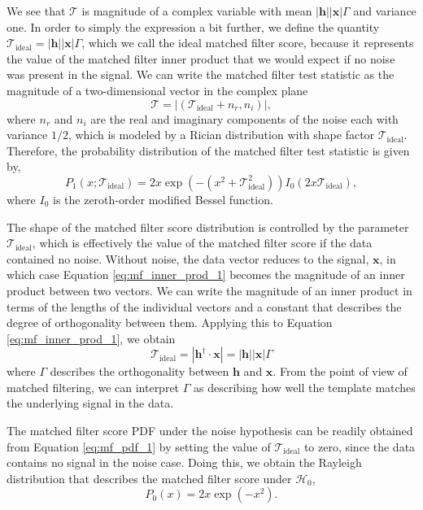 We see that $\mathcal{T}$ is magnitude of a complex variable with mean $|\mathbf{h}||\mathbf{x}|\Gamma$ and variance one. In order to simply the expression a bit further, we define the quantity $\mathcal{T}_\mathrm{ideal}=|\mathbf{h}||\mathbf{x}|\Gamma$, which we call the ideal matched filter score, because it represents the value of the matched filter inner product that we would expect if no noise was present in the signal. We can write the matched filter test statistic as the magnitude of a two-dimensional vector in the complex plane
\begin{equation}
    \mathcal{T}=|\left(\mathcal{T}_\mathrm{ideal}+n_r, n_i\right)|,
\end{equation}
where $n_r$ and $n_i$ are the real and imaginary components of the noise each with variance $1/2$, which is modeled by a Rician distribution with shape factor $\mathcal{T}_\mathrm{ideal}$. Therefore, the probability distribution of the matched filter test statistic is given by,
\begin{equation}
    P_1(x;\mathcal{T}_\mathrm{ideal})=2x\exp{\left(-\left(x^2+\mathcal{T}_\mathrm{ideal}^2\right)\right)}I_0\left(2x\mathcal{T}_\mathrm{ideal}\right),
    \label{eq:mf_pdf_1}
\end{equation}
where $I_0$ is the zeroth-order modified Bessel function.

The shape of the matched filter score distribution is controlled by the parameter $\mathcal{T}_\mathrm{ideal}$, which is effectively the value of the matched filter score if the data contained no noise. Without noise, the data vector reduces to the signal, $\mathbf{x}$, in which case Equation \ref{eq:mf_inner_prod_1} becomes the magnitude of an inner product between two vectors. We can write the magnitude of an inner product in terms of the lengths of the individual vectors and a constant that describes the degree of orthogonality between them. Applying this to Equation \ref{eq:mf_inner_prod_1}, we obtain
\begin{equation}
    \mathcal{T}_\mathrm{ideal}=\left|\mathbf{h}^\dagger\cdot\mathbf{x}\right| = \left|\mathbf{h}\right|\left|\mathbf{x}\right|\Gamma
\end{equation}
where $\Gamma$ describes the orthogonality between $\mathbf{h}$ and $\mathbf{x}$. From the point of view of matched filtering, we can interpret $\Gamma$ as describing how well the template matches the underlying signal in the data.

The matched filter score PDF under the noise hypothesis can be readily obtained from Equation \ref{eq:mf_pdf_1} by setting the value of $\mathcal{T}_\mathrm{ideal}$ to zero, since the data contains no signal in the noise case. Doing this, we obtain the Rayleigh distribution that describes the matched filter score under $\mathcal{H}_0$,
\begin{equation}
    P_0(x) = 2x\exp{\left(-x^2\right)}.
    \label{eq:mf_pdf_0}
\end{equation}


